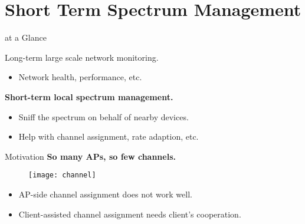 \section{Short Term Spectrum Management}

\begin{frame}{\PS{} at a Glance}
  \begin{figure}
    \centering
  \end{figure}
  {%
    \color{gray}
    Long-term large scale network monitoring.
    \begin{itemize}
      \item \color{gray} Network health, performance, etc.
    \end{itemize}
  }
  \textbf{Short-term local spectrum management.}
  \begin{itemize}
    \item Sniff the spectrum on behalf of nearby devices.
    \item Help with channel assignment, rate adaption, etc.
  \end{itemize}
\end{frame}

\begin{frame}{Motivation}
  \large \textbf{So many APs, so few channels.}
  \begin{figure}
    \centering
    \texttt{[image: channel]}
  \end{figure}
  \begin{itemize}
    \item AP-side channel assignment does not work well.
    \item Client-assisted channel assignment needs client's cooperation.
  \end{itemize}
\end{frame}

